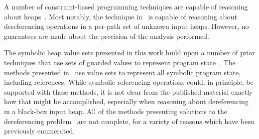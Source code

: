 A number of constraint-based programming techniques are capable of
reasoning about
heaps~\cite{Degrave:2010,Charreteur:2009,Albert:2013}. Most notably,
the technique in~\cite{Albert:2013} is capable of reasoning about
dereferencing operations in a per-path set of unknown input
heaps. However, no guarantees are made about the precision of the
analysis performed.

The symbolic heap value sets presented in this work build upon a
number of prior techniques that use sets of guarded values to
represent program
state~\cite{Sen:2014,Torlak:2014,Yorsh:2008,Xie:2005,Dillig:2011,Elkarablieh:2009}. The
methods presented in~\cite{Sen:2014,Torlak:2014,Yorsh:2008} use value
sets to represent all symbolic program state, including
references. While symbolic referencing operations could, in principle,
be supported with these methods, it is not clear from the published
material exactly how that might be accomplished, especially when
reasoning about dereferencing in a black-box input heap. All of the
methods presenting solutions to the dereferencing
problem~\cite{Xie:2005,Dillig:2011,Elkarablieh:2009} are not complete,
for a variety of reasons which have been previously enumerated.
